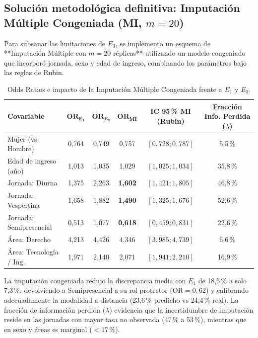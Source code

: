 \documentclass[11pt,a4paper]{article}
\begin{document}
\subsection{Solución metodológica definitiva: Imputación Múltiple Congeniada (MI, $m=20$)}
Para subsanar las limitaciones de $E_3$, se implementó un esquema de **Imputación Múltiple con $m=20$ réplicas** utilizando un modelo congeniado que incorporó jornada, sexo y edad de ingreso, combinando los parámetros bajo las reglas de Rubin.

\begin{table}[h!]
\centering
\small
\caption{Odds Ratios e impacto de la Imputación Múltiple Congeniada frente a $E_1$ y $E_3$.}
\begin{tabular}{lccccc}
\toprule
\textbf{Covariable} & $\mathbf{\text{OR}_{E_1}}$ & $\mathbf{\text{OR}_{E_3}}$ & $\mathbf{\text{OR}_{\text{MI}}}$ & \textbf{IC 95\,\% MI (Rubin)} & \textbf{Fracción Info. Perdida ($\lambda$)} \\
\midrule
Mujer (vs Hombre)       & 0,764 & 0,749 & 0,757 & $[0,728; 0,787]$ & 5,5\,\% \\
Edad de ingreso (año)   & 1,013 & 1,035 & 1,029 & $[1,025; 1,034]$ & 35,8\,\% \\
Jornada: Diurna         & 1,375 & 2,263 & \textbf{1,602} & $[1,421; 1,805]$ & 46,8\,\% \\
Jornada: Vespertina     & 1,658 & 1,882 & \textbf{1,490} & $[1,325; 1,676]$ & 52,6\,\% \\
Jornada: Semipresencial & 0,513 & 1,077 & \textbf{0,618} & $[0,459; 0,831]$ & 22,6\,\% \\
Área: Derecho           & 4,213 & 4,426 & 4,346 & $[3,985; 4,739]$ & 6,6\,\% \\
Área: Tecnología / Ing. & 1,971 & 2,140 & 2,071 & $[1,941; 2,210]$ & 16,9\,\% \\
\bottomrule
\end{tabular}
\end{table}

La imputación congeniada redujo la discrepancia media con $E_1$ de 18,5\,\% a solo 7,3\,\%, devolviendo a Semipresencial a su rol protector ($\text{OR} = 0,62$) y calibrando adecuadamente la modalidad a distancia (23,6\,\% predicho vs 24,4\,\% real). La fracción de información perdida ($\lambda$) evidencia que la incertidumbre de imputación reside en las jornadas con mayor tasa no observada (47\,\% a 53\,\%), mientras que en sexo y áreas es marginal ($<17\,\%$).

\newpage
\end{document}
